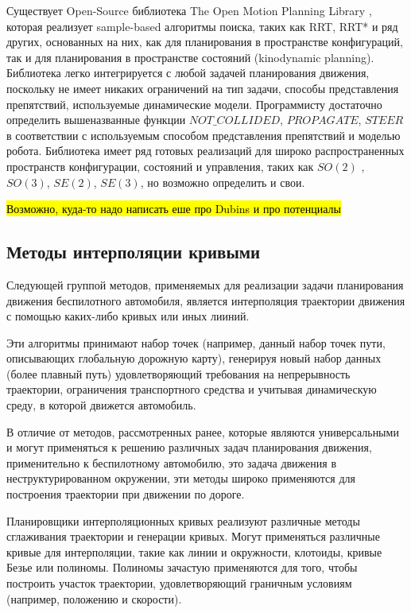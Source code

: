 Существует Open-Source библиотека The Open Motion Planning Library \cite{motion_planning_ompl}, которая реализует
sample-based алгоритмы поиска, таких как RRT, RRT* и ряд других, основанных на них, как для планирования в
пространстве конфигураций, так и для планирования в пространстве состояний (kinodynamic planning). Библиотека легко
интегрируется с любой задачей планирования движения, поскольку не имеет никаких ограничений на тип задачи, способы
представления препятствий, используемые динамические модели. Программисту достаточно определить вышеназванные
функции $NOT\_COLLIDED$, $PROPAGATE$, $STEER$ в соответствии с используемым способом представления препятствий и моделью
робота. Библиотека имеет ряд готовых реализаций для широко распространенных пространств конфигурации, состояний и
управления, таких как $SO(2)$ , $SO(3)$, $SE(2)$, $SE(3)$, но возможно определить и свои.


\hl{Возможно, куда-то надо написать еше про Dubins и про потенциалы}

\subsection{Методы интерполяции кривыми}

Следующей группой методов, применяемых для реализации задачи планирования движения беспилотного
автомобиля, является интерполяция траектории движения с помощью каких-либо кривых или иных лииний.

Эти алгоритмы принимают набор точек (например, данный набор точек пути, описывающих глобальную дорожную карту),
генерируя новый набор данных (более плавный путь) удовлетворяющий требования на непрерывность траектории,
ограничения транспортного средства и учитывая динамическую среду, в которой движется автомобиль.

В отличие от методов, рассмотренных ранее, которые являются универсальными и могут применяться к решению
различных задач планирования движения, применительно к беспилотному автомобилю, это задача движения
в неструктурированном окружении,  эти методы широко применяются для построения траектории при движении
по дороге.

Планировщики интерполяционных кривых реализуют различные методы сглаживания траектории и генерации кривых.
Могут применяться различные кривые для интерполяции, такие как линии и окружности, клотоиды, кривые Безье
или полиномы. Полиномы зачастую применяются для того, чтобы построить участок траектории, удовлетворяющий
граничным условиям (например, положению и скорости).

